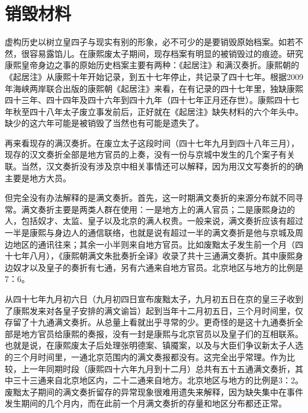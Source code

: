 \begin{sectionnotes}



\end{sectionnotes}
\section{销毁材料}


虚构历史以树立皇四子与现实有别的形象，必不可少的是要销毁原始档案。如若不然，很容易露馅儿。在康熙废太子期间，现存档案有明显的被销毁过的痕迹。研究康熙皇帝身边之事的原始历史档案主要有两种：《起居注》和满汉奏折。康熙朝的《起居注》从康熙十年开始记录，到五十七年停止，共记录了四十七年。根据2009年海峡两岸联合出版的康熙朝《起居注》来看，在有记录的四十七年里，独缺康熙四十三年、四十四年及四十六年到四十九年（四十七年正月还存世）。康熙四十七年秋至四十八年太子废立事发前后，正好就在《起居注》缺失材料的六个年头中。缺少的这六年可能是被销毁了当然也有可能是遗失了。



再来看现存的满汉奏折。在废立太子这段时间（四十七年九月到四十八年三月），现存的汉文奏折全部是地方官员的上奏，没有一份与京城中发生的几个案子有关联。当然，汉文奏折没有涉及京中相关事情还可以解释，因为用汉文写奏折的的确主要是地方大员。



但完全没有办法解释的是满文奏折。首先，这一时期满文奏折的来源分布就不同寻常。满文奏折主要是两类人群在使用：一是地方上的满人官员；二是康熙身边的人，包括奴才、太监、皇子以及北京的满人权贵。一般来说，满文奏折应该有超过一半是康熙与身边人的通信联络，也就是说有超过一半的满文奏折是他与京城及周边地区的通讯往来；其余一小半则来自地方官员。比如废黜太子发生前一个月（四十七年八月），《康熙朝满文朱批奏折全译》收录了共十三通满文奏折。其中康熙身边奴才以及皇子的奏折有七通，另有六通来自地方官员。北京地区与地方的比例是7：6。



从四十七年九月初六日（九月初四日宣布废黜太子，九月初五日在京的皇三子收到了康熙发来对各皇子安排的满文谕旨）起到当年十二月初五日，三个月时间里，仅存留了十九通满文奏折。从总量上看就出乎寻常的少。更奇怪的是这十九通奏折全部是地方官员给康熙的奏报，没有一封是康熙与北京官员以及皇子们的互相联系。也就是说，在康熙废太子后处理张明德案、镇魇案，以及与大臣们争议新太子人选的三个月时间里，一通北京范围内的满文奏报都没有。这完全出乎常理。作为比较，上一年同期时段（康熙四十六年九月到十二月）总共有五十五通满文奏折，其中三十三通来自北京地区内，二十二通来自地方。北京地区与地方的比例是3：2。废黜太子期间的满文奏折留存的异常现象很难用遗失来解释，因为缺失集中在事件发生期间的几个月内，而在此前一个月满文奏折的存量和地区分布都还正常。


